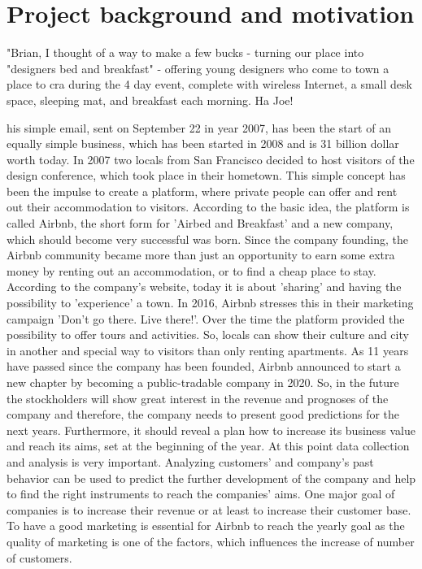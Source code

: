 \documentclass[journal]{IEEEtran}
\begin{document}
\section{Project background and motivation}
\noindent \begin{itshape}"Brian, I thought of a way to make a few bucks - turning our place into "designers bed and breakfast" - offering young designers who come to town a place to cra during the 4 day event, complete with wireless Internet, a small desk space, sleeping mat, and breakfast each morning. Ha Joe! \\
\end{itshape}
his simple email, sent on September 22 in year 2007, has been the start of an equally simple business, which has been started in 2008 and is 31 billion dollar worth today. In 2007 two locals from San Francisco decided to host visitors of the design conference, which took place in their hometown. This simple concept has been the impulse to create a platform, where private people can offer and rent out their accommodation to visitors. According to the basic idea, the platform is called Airbnb, the short form for 'Airbed and Breakfast' and a new company, which should become very successful was born. Since the company founding, the Airbnb community became more than just an opportunity to earn some extra money by renting out an accommodation, or to find a cheap place to stay. According to the company’s website, today it is about 'sharing' and having the possibility to 'experience' a town. In 2016, Airbnb stresses this in their marketing campaign 'Don't go there. Live there!'. Over the time the platform provided the possibility to offer tours and activities. So, locals can show their culture and city in another and special way to visitors than only renting apartments. As 11 years have passed since the company has been founded, Airbnb announced to start a new chapter by becoming a public-tradable company in 2020. So, in the future the stockholders will show great interest in the revenue and prognoses of the company and therefore, the company needs to present good predictions for the next years. Furthermore, it should reveal a plan how to increase its business value and reach its aims, set at the beginning of the year. At this point data collection and analysis is very important. Analyzing customers' and company’s past behavior can be used to predict the further development of the company and help to find the right instruments to reach the companies' aims. One major goal of companies is to increase their revenue or at least to increase their customer base. To have a good marketing is essential for Airbnb to reach the yearly goal as the quality of marketing is one of the factors, which influences the increase of number of customers.\\
\end{document}

